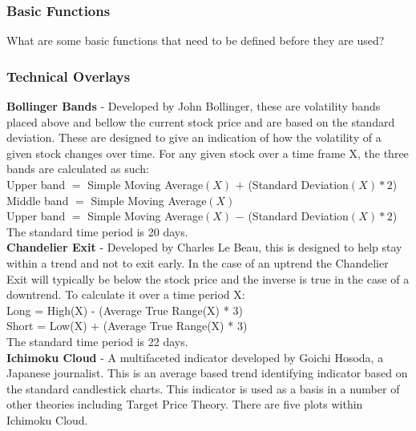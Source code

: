 \documentclass[12pt,a4paper]{article}
\begin{document}
\subsubsection*{Basic Functions}

What are some basic functions that need to be defined before they are used?\\



\subsubsection*{Technical Overlays}

\textbf{Bollinger Bands}  - Developed by John Bollinger, these are volatility bands placed above and bellow the current stock price and are based on the standard deviation. These are designed to give an indication of how the volatility of a given stock changes over time. For any given stock over a time frame X, the three bands are calculated as such:\\

Upper band $=$ Simple Moving Average$(X)$ $+$ (Standard Deviation$(X) * 2$)\\
Middle band $=$ Simple Moving Average$(X)$\\
Upper band $=$ Simple Moving Average$(X)$ $-$ (Standard Deviation$(X) * 2$)\\

The standard time period is 20 days.\\

\iffalse
[Visual knowledge discovery and machine learning for investment strategy]
[Bollinger on bollinger bands]
\fi

\textbf{Chandelier Exit} - Developed by Charles Le Beau, this is designed to help stay within a trend and not to exit early. In the case of an uptrend the Chandelier Exit will typically be below the stock price and the inverse is true in the case of a downtrend. To calculate it over a time period X:\\

Long = High(X) - (Average True Range(X) * 3)\\
Short = Low(X) + (Average True Range(X) * 3)\\

The standard time period is 22 days.\\

\iffalse
[]
\fi

\textbf{Ichimoku Cloud} - A multifaceted indicator developed by Goichi Hosoda, a Japanese journalist. This is an average based trend identifying indicator based on the standard candlestick charts. This indicator is used as a basis in a number of other theories including Target Price Theory. There are five plots within Ichimoku Cloud.\\
\end{document}
